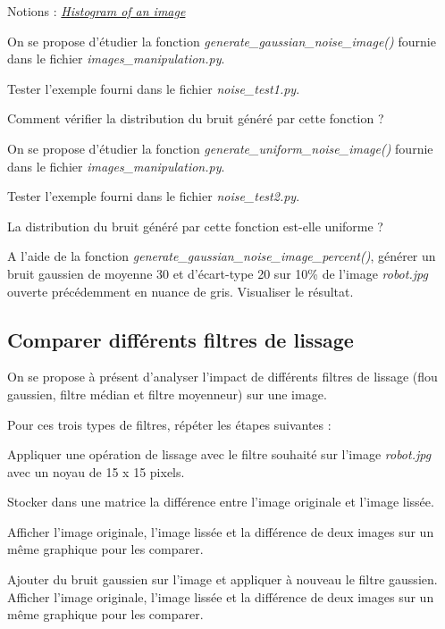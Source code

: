 \documentclass[a4paper,11pt,titlepage]{article} %
\begin{document}
\begin{mdframed}[style=sidebar,frametitle={}]
Notions : \href{https://iogs-lense-training.github.io/image-processing/contents/opencv.html#histogram-of-an-image}{\textit{Histogram of an image}} 
\end{mdframed}

On se propose d'étudier la fonction \textsl{generate\_gaussian\_noise\_image()} fournie dans le fichier \textsl{images\_manipulation.py}.

\Manip Tester l'exemple fourni dans le fichier \textsl{noise\_test1.py}.

\Quest Comment vérifier la distribution du bruit généré par cette fonction ?

\medskip

On se propose d'étudier la fonction \textsl{generate\_uniform\_noise\_image()} fournie dans le fichier \textsl{images\_manipulation.py}.

\Manip Tester l'exemple fourni dans le fichier \textsl{noise\_test2.py}.

\Quest La distribution du bruit généré par cette fonction est-elle uniforme ?

\Manip A l'aide de la fonction \textsl{generate\_gaussian\_noise\_image\_percent()}, générer un bruit gaussien de moyenne 30 et d'écart-type 20 sur 10\% de l'image \textsl{robot.jpg} ouverte précédemment en nuance de gris. Visualiser le résultat.



\newpage
\subsection{Comparer différents filtres de lissage}

On se propose à présent d'analyser l'impact de différents filtres de lissage  (flou gaussien, filtre médian et filtre moyenneur) sur une image.

Pour ces trois types de filtres, répéter les étapes suivantes :

\Manip Appliquer une opération de lissage avec le filtre souhaité sur l'image \textsl{robot.jpg} avec un noyau de 15 x 15 pixels.

\Manip Stocker dans une matrice la différence entre l'image originale et l'image lissée.

\Manip Afficher l'image originale, l'image lissée et la différence de deux images sur un même graphique pour les comparer.

\Manip Ajouter du bruit gaussien sur l'image et appliquer à nouveau le filtre gaussien. Afficher l'image originale, l'image lissée et la différence de deux images sur un même graphique pour les comparer.
\end{document}
